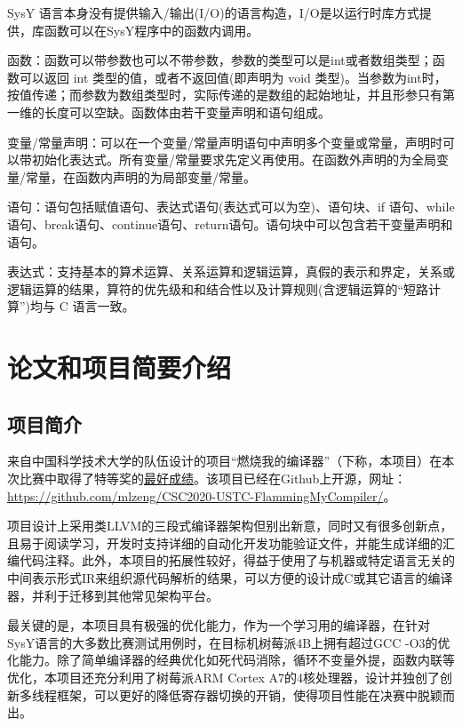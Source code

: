 SysY 语言本身没有提供输入/输出(I/O)的语言构造，I/O是以运行时库方式提供，库函数可以在SysY程序中的函数内调用。

函数：函数可以带参数也可以不带参数，参数的类型可以是int或者数组类型；函数可以返回 int 类型的值，或者不返回值(即声明为 void 类型)。当参数为int时，按值传递；而参数为数组类型时，实际传递的是数组的起始地址，并且形参只有第一维的长度可以空缺。函数体由若干变量声明和语句组成。

变量/常量声明：可以在一个变量/常量声明语句中声明多个变量或常量，声明时可以带初始化表达式。所有变量/常量要求先定义再使用。在函数外声明的为全局变量/常量，在函数内声明的为局部变量/常量。

语句：语句包括赋值语句、表达式语句(表达式可以为空)、语句块、if 语句、while 语句、break语句、continue语句、return语句。语句块中可以包含若干变量声明和语句。

表达式：支持基本的算术运算、关系运算和逻辑运算，真假的表示和界定，关系或逻辑运算的结果，算符的优先级和和结合性以及计算规则(含逻辑运算的“短路计算”)均与 C 语言一致。

\section{论文和项目简要介绍}

\subsection{项目简介}

来自中国科学技术大学的队伍设计的项目“燃烧我的编译器”（下称，本项目）在本次比赛中取得了特等奖的\href{https://compiler.educg.net/2020CSDC}{最好成绩}。该项目已经在Github上开源，网址：\href{https://github.com/mlzeng/CSC2020-USTC-FlammingMyCompiler/}{https://github.com/mlzeng/CSC2020-USTC-FlammingMyCompiler/}。

项目设计上采用类LLVM的三段式编译器架构但别出新意，同时又有很多创新点，且易于阅读学习，开发时支持详细的自动化开发功能验证文件，并能生成详细的汇编代码注释。此外，本项目的拓展性较好，得益于使用了与机器或特定语言无关的中间表示形式IR来组织源代码解析的结果，可以方便的设计成C或其它语言的编译器，并利于迁移到其他常见架构平台。

最关键的是，本项目具有极强的优化能力，作为一个学习用的编译器，在针对SysY语言的大多数比赛测试用例时，在目标机树莓派4B上拥有超过GCC -O3的优化能力。除了简单编译器的经典优化如死代码消除，循环不变量外提，函数内联等优化，本项目还充分利用了树莓派ARM Cortex A7的4核处理器，设计并独创了创新多线程框架，可以更好的降低寄存器切换的开销，使得项目性能在决赛中脱颖而出。

